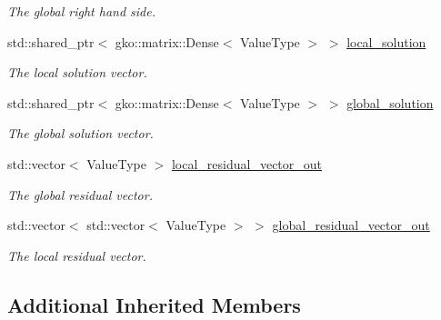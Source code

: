 \begin{DoxyCompactItemize}
\begin{DoxyCompactList}\small\item\em The global right hand side. \end{DoxyCompactList}\item 
\mbox{\label{classschwz_1_1SchwarzBase_a29ef68da307b6de9b8ae878df8fb19d4}} 
std\+::shared\+\_\+ptr$<$ gko\+::matrix\+::\+Dense$<$ Value\+Type $>$ $>$ \hyperlink{classschwz_1_1SchwarzBase_a29ef68da307b6de9b8ae878df8fb19d4}{local\+\_\+solution}
\begin{DoxyCompactList}\small\item\em The local solution vector. \end{DoxyCompactList}\item 
\mbox{\label{classschwz_1_1SchwarzBase_a8e6f088b8a7112af2ce27285d8d91bcc}} 
std\+::shared\+\_\+ptr$<$ gko\+::matrix\+::\+Dense$<$ Value\+Type $>$ $>$ \hyperlink{classschwz_1_1SchwarzBase_a8e6f088b8a7112af2ce27285d8d91bcc}{global\+\_\+solution}
\begin{DoxyCompactList}\small\item\em The global solution vector. \end{DoxyCompactList}\item 
\mbox{\label{classschwz_1_1SchwarzBase_a1ecd383f150abee6b3076338ecc5e783}} 
std\+::vector$<$ Value\+Type $>$ \hyperlink{classschwz_1_1SchwarzBase_a1ecd383f150abee6b3076338ecc5e783}{local\+\_\+residual\+\_\+vector\+\_\+out}
\begin{DoxyCompactList}\small\item\em The global residual vector. \end{DoxyCompactList}\item 
\mbox{\label{classschwz_1_1SchwarzBase_ae060fc8510ce947d893204693755dd97}} 
std\+::vector$<$ std\+::vector$<$ Value\+Type $>$ $>$ \hyperlink{classschwz_1_1SchwarzBase_ae060fc8510ce947d893204693755dd97}{global\+\_\+residual\+\_\+vector\+\_\+out}
\begin{DoxyCompactList}\small\item\em The local residual vector. \end{DoxyCompactList}\end{DoxyCompactItemize}
\subsection*{Additional Inherited Members}


